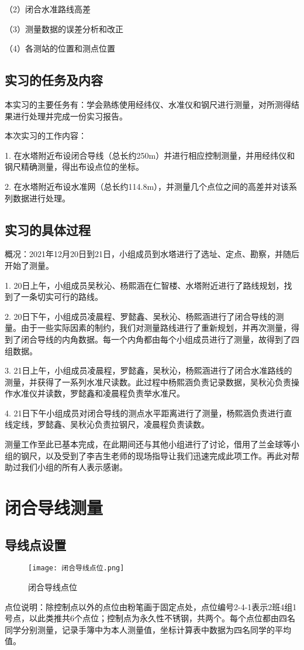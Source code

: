 \documentclass[UTF8]{ctexart}
\begin{document}
	（2）闭合水准路线高差
	
	（3）测量数据的误差分析和改正
	
	（4）各测站的位置和测点位置
	\subsection{实习的任务及内容}
	本实习的主要任务有：学会熟练使用经纬仪、水准仪和钢尺进行测量，对所测得结果进行处理并完成一份实习报告。
	
	本次实习的工作内容：
	
	1. 在水塔附近布设闭合导线（总长约250m）并进行相应控制测量，并用经纬仪和钢尺精确测量，得出布设点位的坐标。
	
	2. 在水塔附近布设水准网（总长约114.8m），并测量几个点位之间的高差并对该系列数据进行处理。
	\subsection{实习的具体过程}
	概况：2021年12月20日到21日，小组成员到水塔进行了选址、定点、勘察，并随后开始了测量。
	
	1. 20日上午，小组成员吴秋沁、杨熙涵在仁智楼、水塔附近进行了路线规划，找到了一条切实可行的路线。
	
	2. 20日下午，小组成员凌晨程、罗懿鑫、吴秋沁、杨熙涵进行了闭合导线的测量。由于一些实际因素的制约，我们对测量路线进行了重新规划，并再次测量，得到了闭合导线的内角数据。每一个内角都由每个小组成员进行了测量，故得到了四组数据。
	
	3. 21日上午，小组成员凌晨程，罗懿鑫，吴秋沁，杨熙涵进行了闭合水准路线的测量，并获得了一系列水准尺读数。此过程中杨熙涵负责记录数据，吴秋沁负责操作水准仪并读数，罗懿鑫和凌晨程负责举水准尺。
	
	4. 21日下午小组成员对闭合导线的测点水平距离进行了测量，杨熙涵负责进行直线定线，罗懿鑫、吴秋沁负责拉钢尺，凌晨程负责读数。
	
	测量工作至此已基本完成，在此期间还与其他小组进行了讨论，借用了兰金球等小组的钢尺，以及受到了李吉生老师的现场指导让我们迅速完成此项工作。再此对帮助过我们小组的所有人表示感谢。

\newpage

\section{闭合导线测量}
	\subsection{导线点设置}
		\begin{figure}[H]
		\centering
		\texttt{[image: 闭合导线点位.png]}
		\caption{闭合导线点位}
		\end{figure}
	点位说明：除控制点以外的点位由粉笔画于固定点处，点位编号2-4-1表示2班4组1号点，以此类推共6个点位；控制点为永久性不锈钢，共两个。每个点位都由四名同学分别测量，记录手簿中为本人测量值，坐标计算表中数据为四名同学的平均值。
\end{document}
